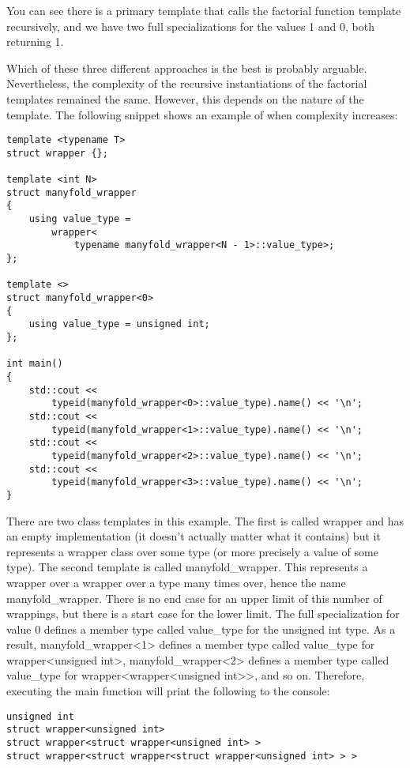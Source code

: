 You can see there is a primary template that calls the factorial function template recursively, and we have two full specializations for the values 1 and 0, both returning 1.

Which of these three different approaches is the best is probably arguable. Nevertheless, the complexity of the recursive instantiations of the factorial templates remained the same. However, this depends on the nature of the template. The following snippet shows an example of when complexity increases:

\begin{lstlisting}[style=styleCXX]
template <typename T>
struct wrapper {};

template <int N>
struct manyfold_wrapper
{
	using value_type =
		wrapper<
			typename manyfold_wrapper<N - 1>::value_type>;
};

template <>
struct manyfold_wrapper<0>
{
	using value_type = unsigned int;
};

int main()
{
	std::cout <<
		typeid(manyfold_wrapper<0>::value_type).name() << '\n';
	std::cout <<
		typeid(manyfold_wrapper<1>::value_type).name() << '\n';
	std::cout <<
		typeid(manyfold_wrapper<2>::value_type).name() << '\n';
	std::cout <<
		typeid(manyfold_wrapper<3>::value_type).name() << '\n';
}
\end{lstlisting}

There are two class templates in this example. The first is called wrapper and has an empty implementation (it doesn’t actually matter what it contains) but it represents a wrapper class over some type (or more precisely a value of some type). The second template is called manyfold\_wrapper. This represents a wrapper over a wrapper over a type many times over, hence the name manyfold\_wrapper. There is no end case for an upper limit of this number of wrappings, but there is a start case for the lower limit. The full specialization for value 0 defines a member type called value\_type for the unsigned int type. As a result, manyfold\_wrapper<1> defines a member type called value\_type for wrapper<unsigned int>, manyfold\_wrapper<2> defines a member type called value\_type for wrapper<wrapper<unsigned int>>, and so on. Therefore, executing the main function will print the following to the console:

\begin{lstlisting}[style=styleCXX]
unsigned int
struct wrapper<unsigned int>
struct wrapper<struct wrapper<unsigned int> >
struct wrapper<struct wrapper<struct wrapper<unsigned int> > >
\end{lstlisting}

